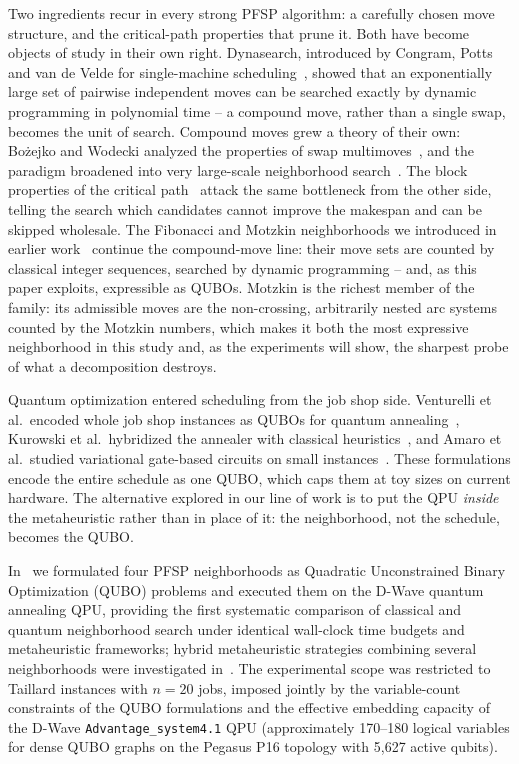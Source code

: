 \documentclass[preprint,12pt,authoryear]{elsarticle}
\begin{document}
Two ingredients recur in every strong PFSP algorithm: a carefully
chosen move structure, and the critical-path properties that prune it.
Both have become objects of study in their own right. Dynasearch,
introduced by Congram, Potts and van de Velde for single-machine
scheduling~\citep{congram02}, showed that an exponentially large set
of pairwise independent moves can be searched exactly by dynamic
programming in polynomial time -- a compound move, rather than a
single swap, becomes the unit of search. Compound moves grew a theory
of their own: Bo\.{z}ejko and Wodecki analyzed the properties of swap
multimoves~\citep{bozejko2007}, and the paradigm broadened into very
large-scale neighborhood search~\citep{ahuja2002}. The block properties of the
critical path~\citep{nowicki96,ref_smutnicki,grabowski04} attack the
same bottleneck from the other side, telling the search which
candidates cannot improve the makespan and can be skipped wholesale.
The Fibonacci and Motzkin neighborhoods we introduced in earlier
work~\citep{WojewodzkiBozejkoBPASTS2026,Motzkin_PWR_EXIT} continue the
compound-move line: their move sets are counted by classical integer
sequences, searched by dynamic programming -- and, as this paper
exploits, expressible as QUBOs. Motzkin is the richest member of the
family: its admissible moves are the non-crossing, arbitrarily nested
arc systems counted by the Motzkin numbers, which makes it both the
most expressive neighborhood in this study and, as the experiments
will show, the sharpest probe of what a decomposition destroys.

Quantum optimization entered scheduling from the job shop side.
Venturelli et al.\ encoded whole job shop instances as QUBOs for
quantum annealing~\citep{venturelli16}, Kurowski et al.\ hybridized
the annealer with classical heuristics~\citep{kurowski20}, and Amaro
et al.\ studied variational gate-based circuits on small
instances~\citep{amaro22}. These formulations encode the entire
schedule as one QUBO, which caps them at toy sizes on current
hardware. The alternative explored in our line of work is to put the
QPU \emph{inside} the metaheuristic rather than in place of it: the
neighborhood, not the schedule, becomes the QUBO.

In~\citep{WojewodzkiBozejkoBPASTS2026} we formulated four PFSP
neighborhoods as Quadratic Unconstrained Binary Optimization (QUBO)
problems and executed them on the D-Wave quantum annealing QPU, providing
the first systematic comparison of classical and quantum neighborhood
search under identical wall-clock time budgets and metaheuristic frameworks;
hybrid metaheuristic strategies combining several neighborhoods were
investigated in~\citep{WojewodzkiBozejko2026}.
The experimental scope was restricted to Taillard instances with $n = 20$
jobs, imposed jointly by the variable-count constraints of the QUBO
formulations and the effective embedding capacity of the D-Wave
\texttt{Advantage\_system4.1} QPU (approximately 170--180 logical variables
for dense QUBO graphs on the Pegasus P16 topology with 5{,}627 active qubits).
\end{document}

